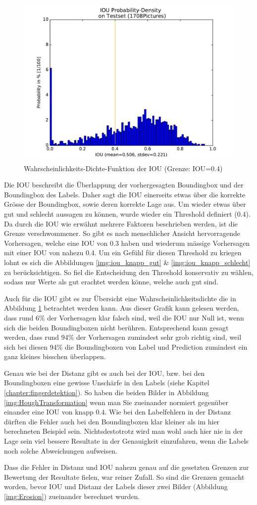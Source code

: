 \begin{figure}
	\centering
	\includegraphics[width=.7\textwidth]{Kapitel/70Resultate/Bilder/IOUprobDensity.pdf}
	\caption{Wahrscheinlichkeits-Dichte-Funktion der IOU (Grenze: IOU=0.4)}
	\label{img:iou_dichte}
\end{figure}


Die IOU beschreibt die Überlappung der vorhergesagten Boundingbox und der Boundingbox des Labels. 
Daher sagt die IOU einerseits etwas über die korrekte Grösse der Boundingbox, sowie deren korrekte Lage aus. 
Um wieder etwas über gut und schlecht aussagen zu können, wurde wieder ein Threshold definiert (0.4).
Da durch die IOU wie erwähnt mehrere Faktoren beschrieben werden, ist die Grenze verschwommener. 
So gibt es nach menschlicher Ansicht hervorragende Vorhersagen, welche eine IOU von 0.3 haben und wiederum mässige Vorhersagen mit einer IOU von nahezu 0.4.
Um ein Gefühl für diesen Threshold zu kriegen lohnt es sich die Abbildungen \ref{img:iou_knapp_gut} \& \ref{img:iou_knapp_schlecht} zu berücksichtigen.
So fiel die Entscheidung den Threshold konservativ zu wählen, sodass nur Werte als gut erachtet werden könne, welche auch gut sind. 

Auch für die IOU gibt es zur Übersicht eine Wahrscheinlichkeitsdichte die in Abbildung \ref{img:iou_dichte} betrachtet werden kann.
Aus dieser Grafik kann gelesen werden, dass rund 6\% der Vorhersagen klar falsch sind, weil die IOU nur Null ist, wenn sich die beiden Boundingboxen nicht berühren. Entsprechend kann gesagt werden, dass rund 94\% der Vorhersagen zumindest sehr grob richtig sind, weil sich bei diesen 94\% die Boundingboxen von Label und Prediction zumindest ein ganz kleines bisschen überlappen. 

Genau wie bei der Distanz gibt es auch bei der IOU, bzw. bei den Boundingboxen eine gewisse Unschärfe in den Labels (siehe Kapitel \ref{chapter:fingerdetektion}).
So haben die beiden Bilder in Abbildung \ref{img:HoughTransformation} wenn man Sie zueinander normiert gegenüber einander eine IOU von knapp $0.4$.
Wie bei den Labelfehlern in der Distanz dürften die Fehler auch bei den Boundingboxen klar kleiner als im hier berechneten Beispiel sein.
Nichtsdestotrotz wird man wohl auch hier nie in der Lage sein viel bessere Resultate in der Genauigkeit einzufahren, wenn die Labels noch solche Abweichungen aufweisen.

Dass die Fehler in Distanz und IOU nahezu genau auf die gesetzten Grenzen zur Bewertung der Resultate fielen, war reiner Zufall.
So sind die Grenzen gemacht worden, bevor IOU und Distanz der Labels dieser zwei Bilder (Abbildung \ref{img:Erosion}) zueinander berechnet wurden.



